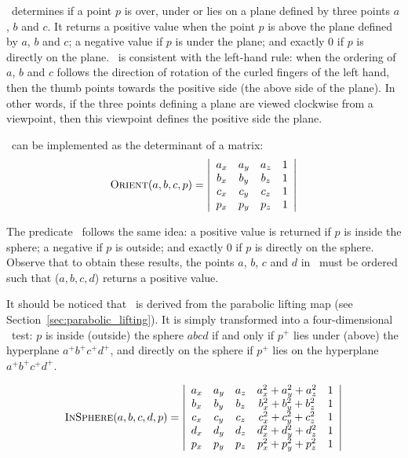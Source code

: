 \Orient\ determines if a point $p$ is over, under or lies on a plane defined by three points $a$, $b$ and $c$.
It returns a positive value when the point $p$ is above the plane defined by $a$, $b$ and $c$; a negative value if $p$ is under the plane; and exactly 0 if $p$ is directly on the plane.
\Orient\ is consistent with the left-hand rule: when the ordering of $a$, $b$ and $c$ follows the direction of rotation of the curled fingers of the left hand, then the thumb points towards the positive side (the above side of the plane). 
In other words, if the three points defining a plane are viewed clockwise from a viewpoint, then this viewpoint defines the positive side the plane.

\Orient\ can be implemented as the determinant of a matrix:
\begin{equation}
  \textrm{O}\textsc{rient}(a, b, c, p) = 
  \left| 
  \begin{array}{cccc}
    a_{x} & a_{y} & a_{z} & 1 \\
    b_{x} & b_{y} & b_{z} & 1 \\
    c_{x} & c_{y} & c_{z} & 1 \\
    p_{x} & p_{y} & p_{z} & 1 
  \end{array} 
  \right| 
\end{equation}
%


The predicate \Insphere\ follows the same idea: a positive value is returned if $p$ is inside the sphere; a negative if $p$ is outside; and exactly 0 if $p$ is directly on the sphere. 
Observe that to obtain these results, the points $a$, $b$, $c$ and $d$ in \Insphere\ must be ordered such that \Orient($a,b,c,d$) returns a positive value. 

It should be noticed that \Insphere\ is derived from the parabolic lifting map (see Section~\ref{sec:parabolic_lifting}). 
It is simply transformed into a four-dimensional \Orient\ test: $p$ is inside (outside) the sphere $abcd$ if and only if $p^{+}$ lies under (above) the hyperplane $a^{+}b^{+}c^{+}d^{+}$, and directly on the sphere if $p^{+}$ lies on the hyperplane $a^{+}b^{+}c^{+}d^{+}$.

\begin{equation}
  \textrm{I}\textsc{n}\textrm{S}\textsc{phere}(a, b, c, d, p) = 
  \left| 
  \begin{array}{ccccc}
    a_{x} & a_{y} & a_{z} & a^{2}_{x} + a^{2}_{y} + a^{2}_{z} & 1 \\
    b_{x} & b_{y} & b_{z} & b^{2}_{x} + b^{2}_{y} + b^{2}_{z} & 1 \\
    c_{x} & c_{y} & c_{z} & c^{2}_{x} + c^{2}_{y} + c^{2}_{z} & 1 \\
    d_{x} & d_{y} & d_{z} & d^{2}_{x} + d^{2}_{y} + d^{2}_{z} & 1 \\
    p_{x} & p_{y} & p_{z} & p^{2}_{x} + p^{2}_{y} + p^{2}_{z} & 1 
  \end{array} 
  \right|%
\label{eq:insphere}
\end{equation}


